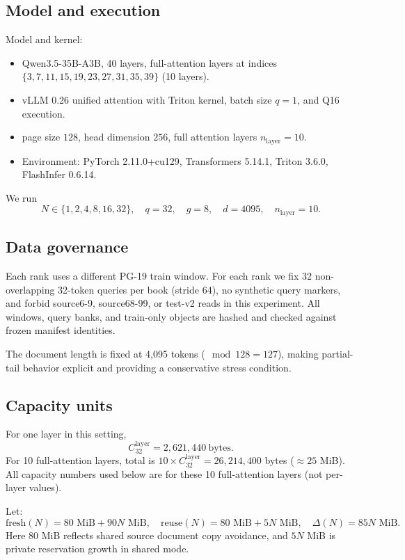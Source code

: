 \documentclass{article}
\begin{document}
\subsection{Model and execution}
Model and kernel:
\begin{itemize}
  \item Qwen3.5-35B-A3B, 40 layers, full-attention layers at indices $\{3,7,11,15,19,23,27,31,35,39\}$ (10 layers).
  \item vLLM 0.26 unified attention with Triton kernel, batch size $q=1$, and Q16 execution.
  \item page size $128$, head dimension $256$, full attention layers $n_{\text{layer}}=10$.
  \item Environment: PyTorch 2.11.0+cu129, Transformers 5.14.1, Triton 3.6.0, FlashInfer 0.6.14.
\end{itemize}

We run
\[
N \in \{1,2,4,8,16,32\},\quad q=32,\quad g=8,\quad d=4095,\quad n_{\text{layer}}=10.
\]

\subsection{Data governance}
Each rank uses a different PG-19 train window. For each rank we fix 32 non-overlapping 32-token queries per book (stride 64), no synthetic query markers, and forbid source6-9, source68-99, or test-v2 reads in this experiment. All windows, query banks, and train-only objects are hashed and checked against frozen manifest identities.

The document length is fixed at 4,095 tokens ($\mod 128 = 127$), making partial-tail behavior explicit and providing a conservative stress condition.

\subsection{Capacity units}
For one layer in this setting,
\[
 C_{32}^{\text{layer}} = 2{,}621{,}440\ \text{bytes}.
\]
For 10 full-attention layers, total is $10 \times C_{32}^{\text{layer}}=26{,}214{,}400$ bytes ($\approx25$ MiB). All capacity numbers used below are for these 10 full-attention layers (not per-layer values).

Let:
\[
\text{fresh}(N)=80\text{ MiB}+90N\text{ MiB},\quad
\text{reuse}(N)=80\text{ MiB}+5N\text{ MiB},\quad
\Delta(N)=85N\text{ MiB}.
\]
Here 80 MiB reflects shared source document copy avoidance, and $5N$ MiB is private reservation growth in shared mode.
\end{document}
